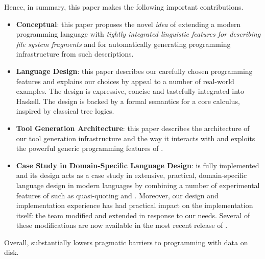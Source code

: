 Hence, in summary, this paper makes the following important contributions.

\begin{itemize}
\item {\bf Conceptual}:  this paper proposes the novel {\em idea} 
of extending a modern programming language with
{\em tightly integrated linguistic features for describing file system 
fragments}
and for automatically generating programming infrastructure from such 
descriptions.

\item {\bf Language Design}: this paper describes our 
  carefully chosen \forest{}
  programming features and explains our choices by appeal to a number of 
  real-world examples.
  The design is expressive, concise and tastefully integrated into
  Haskell.  The design is backed by a formal semantics for a core calculus,
  inspired by classical tree logics.

\item {\bf Tool Generation Architecture}: this paper describes the architecture of
  our tool generation infrastructure and the way it interacts with and 
  exploits the powerful generic programming features of \haskell{}.

\item {\bf Case Study in Domain-Specific Language Design}: \forest{}
  is fully implemented and its design 
  acts as a case study in extensive, practical, domain-specific
  language design in modern languages by combining a number of
  experimental features of \haskell{} such as quasi-quoting and \template{}.
  Moreover, our \forest{} design and implementation experience 
  has had practical impact on the \haskell{} implementation itself:  
  the \haskell{} team modified and extended
  \template{} in response to our needs.  Several of these modifications
  are now available in the most recent release of \haskell{}.
\end{itemize}

Overall, \forest{} substantially lowers pragmatic barriers to programming 
with data on disk.


